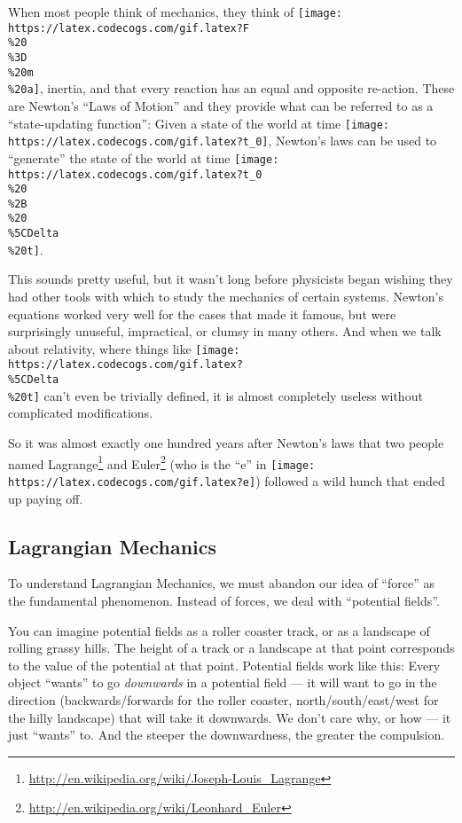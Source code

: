 \documentclass[]{article}
\renewcommand{\href}[2]{#2\footnote{\url{#1}}}
\begin{document}
When most people think of mechanics, they think of
\texttt{[image: https://latex.codecogs.com/gif.latex?F\\\%20\\\%3D\\\%20m\\\%20a]},
inertia, and that every reaction has an equal and opposite re-action. These are
Newton's ``Laws of Motion'' and they provide what can be referred to as a
``state-updating function'': Given a state of the world at time
\texttt{[image: https://latex.codecogs.com/gif.latex?t\_0]}, Newton's laws can be
used to ``generate'' the state of the world at time
\texttt{[image: https://latex.codecogs.com/gif.latex?t\_0\\\%20\\\%2B\\\%20\\\%5CDelta\\\%20t]}.

This sounds pretty useful, but it wasn't long before physicists began wishing
they had other tools with which to study the mechanics of certain systems.
Newton's equations worked very well for the cases that made it famous, but were
surprisingly unuseful, impractical, or clumsy in many others. And when we talk
about relativity, where things like
\texttt{[image: https://latex.codecogs.com/gif.latex?\\\%5CDelta\\\%20t]} can't even
be trivially defined, it is almost completely useless without complicated
modifications.

So it was almost exactly one hundred years after Newton's laws that two people
named \href{http://en.wikipedia.org/wiki/Joseph-Louis_Lagrange}{Lagrange} and
\href{http://en.wikipedia.org/wiki/Leonhard_Euler}{Euler} (who is the ``e'' in
\texttt{[image: https://latex.codecogs.com/gif.latex?e]}) followed a wild hunch
that ended up paying off.

\subsection{Lagrangian Mechanics}\label{lagrangian-mechanics}

To understand Lagrangian Mechanics, we must abandon our idea of ``force'' as the
fundamental phenomenon. Instead of forces, we deal with ``potential fields''.

You can imagine potential fields as a roller coaster track, or as a landscape of
rolling grassy hills. The height of a track or a landscape at that point
corresponds to the value of the potential at that point. Potential fields work
like this: Every object ``wants'' to go \emph{downwards} in a potential field
--- it will want to go in the direction (backwards/forwards for the roller
coaster, north/south/east/west for the hilly landscape) that will take it
downwards. We don't care why, or how --- it just ``wants'' to. And the steeper
the downwardness, the greater the compulsion.
\end{document}
